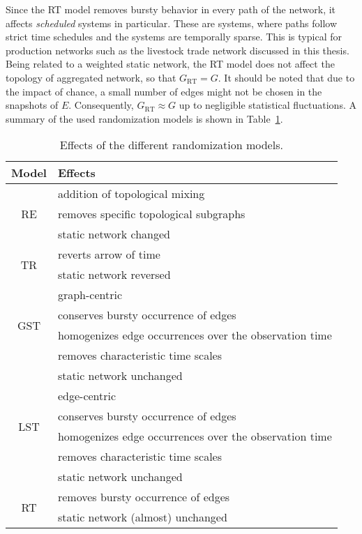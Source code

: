 Since the RT model removes bursty behavior in every path of the network, it affects \emph{scheduled} systems in particular.
These are systems, where paths follow strict time schedules and the systems are temporally sparse.
This is typical for production networks such as the livestock trade network discussed in this thesis.
Being related to a weighted static network, the RT model does not affect the topology of aggregated network, so that $G_\mathrm{RT}=G$.
It should be noted that due to the impact of chance, a small number of edges might not be chosen in the snapshots of $E$.
Consequently, $G_\mathrm{RT}\approx G$ up to negligible statistical fluctuations.
%
A summary of the used randomization models is shown in Table~\ref{tab:random_models}.
\begin{table}[htb]
\sffamily
\begin{center}%
\caption{Effects of the different randomization models.
}
\begin{tabular*}{\hsize}{@{\extracolsep{\fill}}cl}
\hline
Model & Effects\\
\hline \hline
\multirow{3}{*}{RE} & addition of topological mixing\\
& removes specific topological subgraphs\\
& static network changed\\
\hline
\multirow{2}{*}{TR} & reverts arrow of time\\
& static network reversed\\
\hline
\multirow{4}{*}{GST} & graph-centric\\
&conserves bursty occurrence of edges\\
& homogenizes edge occurrences over the observation time\\
& removes characteristic time scales\\
& static network unchanged\\
%
\hline
\multirow{4}{*}{LST} & edge-centric \\
& conserves bursty occurrence of edges\\
& homogenizes edge occurrences over the observation time\\
& removes characteristic time scales\\
& static network unchanged\\
%
\hline
\multirow{2}{*}{RT} & removes bursty occurrence of edges\\
& static network (almost) unchanged \\
\hline \hline
\end{tabular*}
\label{tab:random_models}
\end{center}
\end{table}

